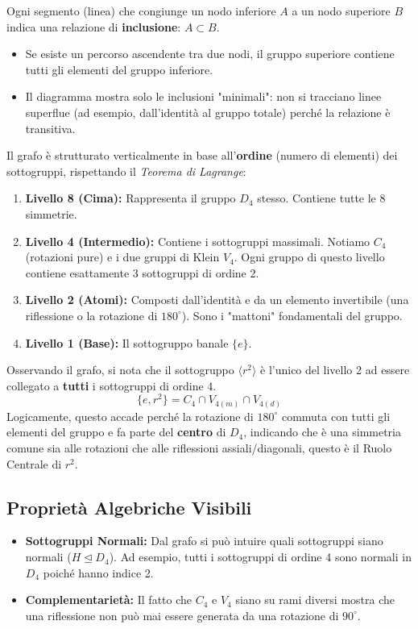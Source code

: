 Ogni segmento (linea) che congiunge un nodo inferiore $A$ a un nodo superiore $B$ indica una relazione di \textbf{inclusione}: $A \subset B$.
\begin{itemize}
  \item Se esiste un percorso ascendente tra due nodi, il gruppo superiore contiene tutti gli elementi del gruppo inferiore.
  \item Il diagramma mostra solo le inclusioni "minimali": non si tracciano linee superflue (ad esempio, dall'identità al gruppo totale) perché la relazione è transitiva.
\end{itemize}

Il grafo è strutturato verticalmente in base all'\textbf{ordine} (numero di elementi) dei sottogruppi, rispettando il \textit{Teorema di Lagrange}:
\begin{enumerate}
  \item \textbf{Livello 8 (Cima):} Rappresenta il gruppo $D_4$ stesso. Contiene tutte le 8 simmetrie.
  \item \textbf{Livello 4 (Intermedio):} Contiene i sottogruppi massimali. Notiamo $C_4$ (rotazioni pure) e i due gruppi di Klein $V_4$. Ogni gruppo di questo livello contiene esattamente 3 sottogruppi di ordine 2.
  \item \textbf{Livello 2 (Atomi):} Composti dall'identità e da un elemento invertibile (una riflessione o la rotazione di $180^\circ$). Sono i "mattoni" fondamentali del gruppo.
  \item \textbf{Livello 1 (Base):} Il sottogruppo banale $\{e\}$.
\end{enumerate}

Osservando il grafo, si nota che il sottogruppo $\langle r^2 \rangle$ è l'unico del livello 2 ad essere collegato a \textbf{tutti} i sottogruppi di ordine 4.
\[
\{e, r^2\} = C_4 \cap V_{4(m)} \cap V_{4(d)}
\]
Logicamente, questo accade perché la rotazione di $180^\circ$ commuta con tutti gli elementi del gruppo e fa parte del \textbf{centro} di $D_4$,
indicando che è una simmetria comune sia alle rotazioni che alle riflessioni assiali/diagonali, questo è il Ruolo Centrale di $r^2$.

\subsection{Proprietà Algebriche Visibili}
\begin{itemize}
    \item \textbf{Sottogruppi Normali:} Dal grafo si può intuire quali sottogruppi siano normali ($H \trianglelefteq D_4$). Ad esempio, tutti i sottogruppi di ordine 4 sono normali in $D_4$ poiché hanno indice 2.
    \item \textbf{Complementarietà:} Il fatto che $C_4$ e $V_4$ siano su rami diversi mostra che una riflessione non può mai essere generata da una rotazione di $90^\circ$.
\end{itemize}

